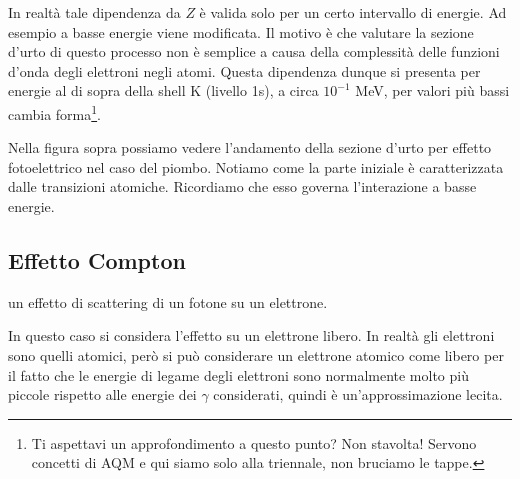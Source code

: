 \vspace{0.3cm}In realtà tale dipendenza da $Z$ è valida solo per un certo intervallo di energie. Ad esempio a basse energie viene modificata. Il motivo è che valutare la sezione d'urto di questo processo non è semplice a causa della complessità delle funzioni d'onda degli elettroni negli atomi. Questa dipendenza dunque si presenta per energie al di sopra della shell K (livello 1s), a circa $10^{-1}$ MeV, per valori più bassi cambia forma\footnote{Ti aspettavi un approfondimento a questo punto? Non stavolta! Servono concetti di AQM e qui siamo solo alla triennale, non bruciamo le tappe.}.

Nella figura sopra possiamo vedere l'andamento della sezione d'urto per effetto fotoelettrico nel caso del piombo. Notiamo come la parte iniziale è caratterizzata dalle transizioni atomiche. Ricordiamo che esso governa l'interazione a basse energie.

\subsection{Effetto Compton}

\E un effetto di scattering di un fotone su un elettrone.

\begin{figure}[H]
    \centering
\end{figure}

In questo caso si considera l'effetto su un elettrone libero. In realtà gli elettroni sono quelli atomici, però si può considerare un elettrone atomico come libero per il fatto che le energie di legame degli elettroni sono normalmente molto più piccole rispetto alle energie dei $\gamma$ considerati, quindi è un'approssimazione lecita. 


